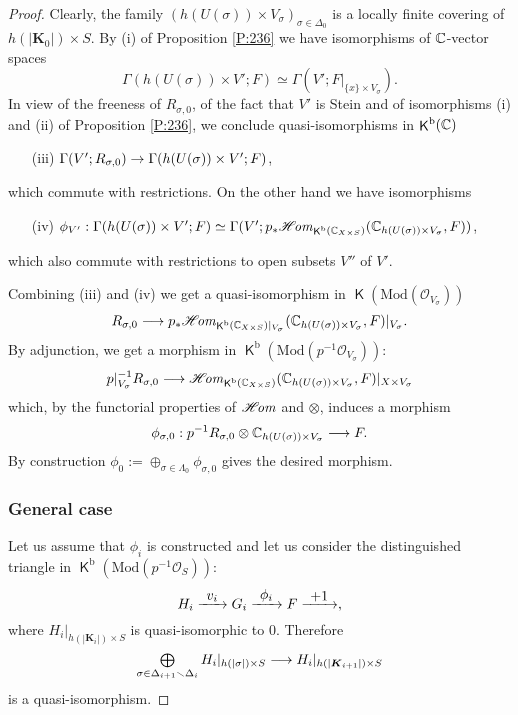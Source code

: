 \documentclass[english]{smfart}
\numberwithin{subsection}{section}
\def\sho{\mathcal{O}}\let\cO\sho
\newcommand{\bK}{\boldsymbol{K}}
\newcommand{\rb}{\mathrm{b}}
\newcommand{\Mod}{\mathrm{Mod}}
\newcommand{\XS}{X\times S}
\DeclareMathOperator{\rK}{\mathsf{K}}
\let\setminus\smallsetminus
\newcommand{\pOS}{p^{-1}\sho_S}
\numberwithin{equation}{section}
\theoremstyle{plain}
\theoremstyle{definition}
\def\to{\mathchoice{\longrightarrow}{\rightarrow}{\rightarrow}{\rightarrow}}
\def\To#1{\mathchoice{\xrightarrow{\textstyle\kern4pt#1\kern3pt}}{\stackrel{#1}{\longrightarrow}}{}{}}
\let\oldbigoplus\bigoplus
\renewcommand{\bigoplus}{\mathop{\textstyle\oldbigoplus}\displaylimits}
\begin{document}
\begin{proof}
Clearly, the family $(h(U(\sigma))\times V_{\sigma})_{\sigma\in\Delta_0}$ is a locally finite covering of $h(|\bK_0|)\times S$. By (i) of Proposition \ref{P:236} we have isomorphisms of $\mathbb{C}$-vector spaces
$$
\Gamma(h(U(\sigma))\times V'; F)\simeq \Gamma(V'; F|_{{\{x\}\times V_{\sigma}}}).
$$
In view of the freeness of $R_{\sigma,0}$, of the fact that $V'$ is Stein and of isomorphisms (i) and (ii) of Proposition \ref{P:236}, we conclude quasi-isomorphisms in $\rK^{\rb}(\CC)$
\begin{enumerate}
\item[(iii)]
$\Gamma (V'; R_{\sigma,0})\to \Gamma(h(U(\sigma))\times V'; F)$,
\end{enumerate}
which commute with restrictions. On the other hand we have isomorphisms
\begin{enumerate}
\item[(iv)]
$\phi_{V'}:\Gamma(h(U(\sigma))\times V'; F)\simeq \Gamma(V'; p_*\ho_{\rK^\rb(\CC_{\XS})}( \CC_{h(U(\sigma))\times V_{\sigma}}, F))$,
\end{enumerate}
which also commute with restrictions to open subsets $V''$ of $V'$.

Combining (iii) and (iv) we get a quasi-isomorphism in $\rK(\Mod(\sho_{V_{\sigma}}))$
$$
R_{\sigma,0}\to p_*\ho_{\rK^\rb(\CC_{\XS})|_{V_{\sigma}}}( \CC_{h(U(\sigma))\times V_{\sigma}}, F)|_{V_{\sigma}}.
$$
By adjunction, we get a morphism in $\rK^\rb(\Mod(p^{-1}\sho_{V_{\sigma}}))$:
$$p|_{V_{\sigma}}^{-1}R_{\sigma,0}\to \ho_{\rK^\rb(\CC_{\XS})}( \CC_{h(U(\sigma))\times V_{\sigma}}, F)|_{X\times V_{\sigma}}$$
which, by the functorial properties of $\mathscr{H}\!\mathit{om}$ and $\otimes$, induces a morphism
\begin{equation}
\phi_{\sigma,0}: p^{-1}R_{\sigma,0}\otimes \CC_{h(U(\sigma))\times V_{\sigma}}\to F.
\end{equation}
By construction $\phi_0:=\oplus_{\sigma\in\Lambda_0}\phi_{\sigma,0}$ gives the desired morphism.

\subsubsection*{General case}
Let us assume that $\phi_i$ is constructed and let us consider the distinguished triangle in $\rK^\rb(\Mod(\pOS))$:
$$
H_i\To{v_i} G_i\To{\phi_i} F\To{+1},
$$
where $H_i|_{h(|\bK_i|)\times S}$ is quasi-isomorphic to $0$. Therefore
$$
\bigoplus_{\sigma\in \Delta_{i+1}\setminus \Delta_i}
H_i|_{h(|\sigma|)\times S}\to H_i|_{h(|\bK_{i+1}|)\times S}$$
is a quasi-isomorphism.


\end{proof}
\end{document}
